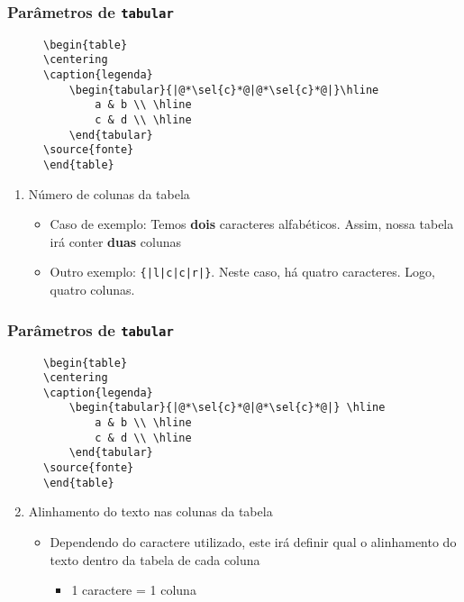 \begin{frame}[fragile] \frametitle{Parâmetros de \texttt{tabular}}
\begin{figure}[!t]
\begin{lstlisting}
\begin{table}
\centering
\caption{legenda}
	\begin{tabular}{|@*\sel{c}*@|@*\sel{c}*@|}\hline
		a & b \\ \hline
		c & d \\ \hline
	\end{tabular}
\source{fonte}
\end{table}
\end{lstlisting}
\end{figure}

\begin{enumerate}
	\item Número de colunas da tabela
	\begin{itemize}
		\item Caso de exemplo: Temos \textbf{dois} caracteres alfabéticos. Assim, nossa tabela irá conter \textbf{duas} colunas
		\item Outro exemplo: \texttt{\{|l|c|c|r|\}}. Neste caso, há quatro caracteres. Logo, quatro colunas.
	\end{itemize}
\end{enumerate}

\end{frame}

\begin{frame}[fragile] \frametitle{Parâmetros de \texttt{tabular}}
\vspace{-0.5cm}
\begin{figure}[!t]
\begin{lstlisting}
\begin{table}
\centering
\caption{legenda}
	\begin{tabular}{|@*\sel{c}*@|@*\sel{c}*@|} \hline
		a & b \\ \hline
		c & d \\ \hline
	\end{tabular}
\source{fonte}
\end{table}
\end{lstlisting}
\end{figure}

\begin{enumerate}
	\setcounter{enumi}{1}
	\item Alinhamento do texto nas colunas da tabela
	\begin{itemize}
		\item Dependendo do caractere utilizado, este irá definir qual o alinhamento do texto dentro da tabela de cada coluna 
		\begin{itemize}
			\item 1 caractere = 1 coluna
		\end{itemize}
	\end{itemize}
\end{enumerate}
\end{frame}

